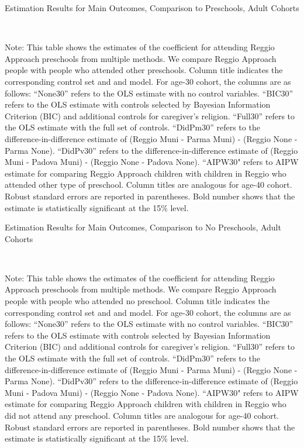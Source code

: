 \begin{landscape}
\begin{table}[H] \caption{Estimation Results for Main Outcomes, Comparison to Preschools, Adult Cohorts} \label{ols-M-adult-reg-pres}
\scalebox{0.8}{}
\vspace{1ex} \\
\footnotesize\raggedright{Note: This table shows the estimates of the coefficient for attending Reggio Approach preschools from multiple methods. We compare Reggio Approach people with people who attended other preschools.  Column title indicates the corresponding control set and and model. For age-30 cohort, the columns are as follows: ``None30'' refers to the OLS estimate with no control variables. ``BIC30'' refers to the OLS estimate with controls selected by Bayesian Information Criterion (BIC) and additional controls for caregiver's religion. ``Full30'' refers to the OLS estimate with the full set of controls. ``DidPm30'' refers to the difference-in-difference estimate of (Reggio Muni - Parma Muni) - (Reggio None - Parma None). ``DidPv30'' refers to the difference-in-difference estimate of (Reggio Muni - Padova Muni) - (Reggio None - Padova None).  ``AIPW30" refers to AIPW estimate for comparing Reggio Approach children with children in Reggio who attended other type of preschool. Column titles are analogous for age-40 cohort. Robust standard errors are reported in parentheses. Bold number shows that the estimate is statistically significant at the 15\% level.}
\end{table}

\begin{table}[H] \caption{Estimation Results for Main Outcomes, Comparison to No Preschools, Adult Cohorts} \label{ols-M-adult-reg-nopres}
\scalebox{0.8}{}
\vspace{1ex} \\
\footnotesize\raggedright{Note: This table shows the estimates of the coefficient for attending Reggio Approach preschools from multiple methods. We compare Reggio Approach people with people who attended no preschool. Column title indicates the corresponding control set and and model. For age-30 cohort, the columns are as follows: ``None30'' refers to the OLS estimate with no control variables. ``BIC30'' refers to the OLS estimate with controls selected by Bayesian Information Criterion (BIC) and additional controls for caregiver's religion. ``Full30'' refers to the OLS estimate with the full set of controls. ``DidPm30'' refers to the difference-in-difference estimate of (Reggio Muni - Parma Muni) - (Reggio None - Parma None). ``DidPv30'' refers to the difference-in-difference estimate of (Reggio Muni - Padova Muni) - (Reggio None - Padova None).  ``AIPW30" refers to AIPW estimate for comparing Reggio Approach children with children in Reggio who did not attend any preschool. Column titles are analogous for age-40 cohort. Robust standard errors are reported in parentheses. Bold number shows that the estimate is statistically significant at the 15\% level.}
\end{table}

\end{landscape}
